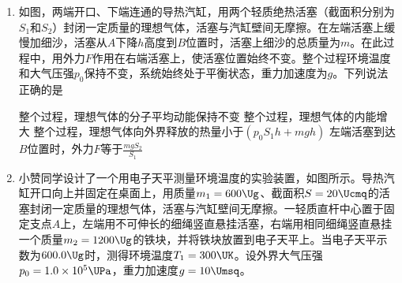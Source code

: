 \documentclass[\gkver]{gaokaozhenti}
\begin{document}
\begin{enumerate}
{	$\frac{3\lambda-1}{\lambda-3}\mu L\leq h\leq\frac{\lambda^{2}+\lambda+1}{(\lambda-1)^{2}}\cdot4\mu L$
}


\item
如图，两端开口、下端连通的导热汽缸，用两个轻质绝热活塞（截面积分别为$S_{1}$和$S_{2}$）封闭一定质量的理想气体，活塞与汽缸壁间无摩擦。在左端活塞上缓慢加细沙，活塞从$A$下降$h$高度到$B$位置时，活塞上细沙的总质量为$m$。在此过程中，用外力$F$作用在右端活塞上，使活塞位置始终不变。整个过程环境温度和大气压强$p_{0}$保持不变，系统始终处于平衡状态，重力加速度为$g$。下列说法正确的是 


{整个过程，理想气体的分子平均动能保持不变}
{整个过程，理想气体的内能增大}
{整个过程，理想气体向外界释放的热量小于$\left(p_{0}S_{1}h+mgh\right)$}
{左端活塞到达$B$位置时，外力$F$等于$\frac{mgS_{2}}{S_{1}}$}


\item
小赞同学设计了一个用电子天平测量环境温度的实验装置，如图所示。导热汽缸开口向上并固定在桌面上，用质量$m_{1} = 600 \Ug$、截面积$S = 20 \Ucmq$的活塞封闭一定质量的理想气体，活塞与汽缸壁间无摩擦。一轻质直杆中心置于固定支点$A$上，左端用不可伸长的细绳竖直悬挂活塞，右端用相同细绳竖直悬挂一个质量$m_{2} = 1200 \Ug$的铁块，并将铁块放置到电子天平上。当电子天平示数为$600.0 \Ug$时，测得环境温度$T_{1} = 300 \UK$。设外界大气压强$p_{0} = 1.0\times10^{5} \UPa$，重力加速度$g = 10 \Umsq$。


\end{enumerate}
\end{document}
